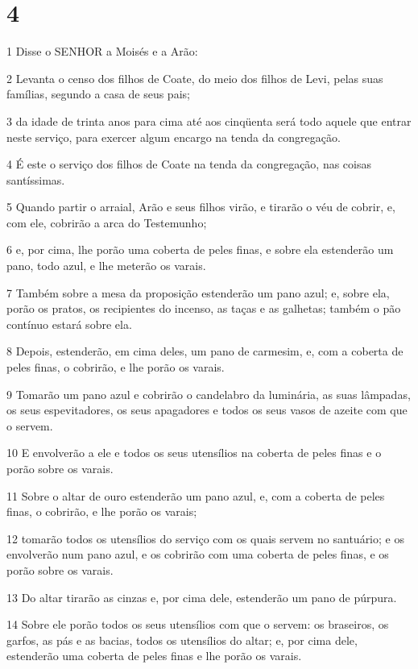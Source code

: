 \chapter{4}

\par 1 Disse o SENHOR a Moisés e a Arão:
\par 2 Levanta o censo dos filhos de Coate, do meio dos filhos de Levi, pelas suas famílias, segundo a casa de seus pais;
\par 3 da idade de trinta anos para cima até aos cinqüenta será todo aquele que entrar neste serviço, para exercer algum encargo na tenda da congregação.
\par 4 É este o serviço dos filhos de Coate na tenda da congregação, nas coisas santíssimas.
\par 5 Quando partir o arraial, Arão e seus filhos virão, e tirarão o véu de cobrir, e, com ele, cobrirão a arca do Testemunho;
\par 6 e, por cima, lhe porão uma coberta de peles finas, e sobre ela estenderão um pano, todo azul, e lhe meterão os varais.
\par 7 Também sobre a mesa da proposição estenderão um pano azul; e, sobre ela, porão os pratos, os recipientes do incenso, as taças e as galhetas; também o pão contínuo estará sobre ela.
\par 8 Depois, estenderão, em cima deles, um pano de carmesim, e, com a coberta de peles finas, o cobrirão, e lhe porão os varais.
\par 9 Tomarão um pano azul e cobrirão o candelabro da luminária, as suas lâmpadas, os seus espevitadores, os seus apagadores e todos os seus vasos de azeite com que o servem.
\par 10 E envolverão a ele e todos os seus utensílios na coberta de peles finas e o porão sobre os varais.
\par 11 Sobre o altar de ouro estenderão um pano azul, e, com a coberta de peles finas, o cobrirão, e lhe porão os varais;
\par 12 tomarão todos os utensílios do serviço com os quais servem no santuário; e os envolverão num pano azul, e os cobrirão com uma coberta de peles finas, e os porão sobre os varais.
\par 13 Do altar tirarão as cinzas e, por cima dele, estenderão um pano de púrpura.
\par 14 Sobre ele porão todos os seus utensílios com que o servem: os braseiros, os garfos, as pás e as bacias, todos os utensílios do altar; e, por cima dele, estenderão uma coberta de peles finas e lhe porão os varais.
